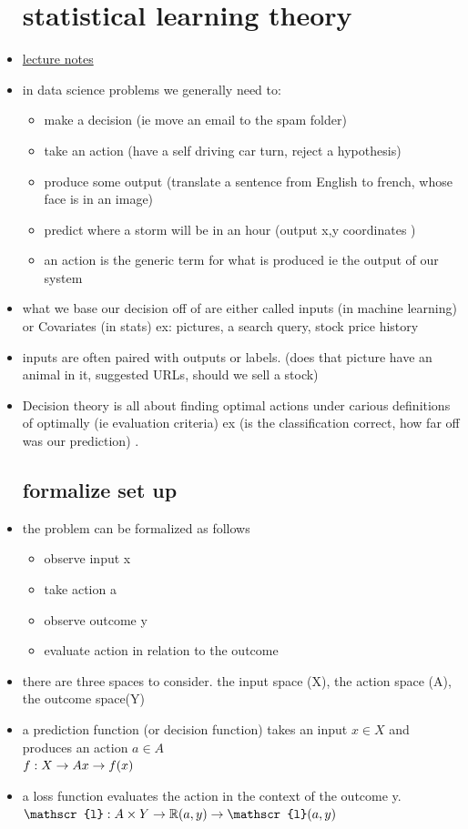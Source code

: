 \documentclass{article}
\begin{document}
\begin{itemize}
\section{statistical learning theory}
\item \href{https://nyu-ds1003.github.io/mlcourse/2023/lectures/lec01/01c.intro-stat-learning-theory.pdf}{lecture notes}
\item in data science problems we generally need to:
\begin{itemize}
    \item make a decision (ie move an email to the spam folder) 
    \item take an action (have a self driving car turn, reject a hypothesis)
    \item produce some output (translate a sentence from English to french, whose face is in an image) 
    \item predict where a storm will be in an hour (output x,y coordinates )
    \item an action is the generic term for what is produced ie the output of our system 
\end{itemize}
\item what we base our decision  off of are either called inputs (in machine learning) or Covariates  (in stats) ex: pictures, a search query, stock price history
\item inputs are often paired with outputs or labels. (does that picture have an animal in it, suggested URLs, should we sell a stock)
\item Decision  theory is all about finding optimal actions under carious definitions of optimally (ie evaluation criteria) ex (is the classification correct, how far off was our prediction) .
\subsection{formalize set up}
\item the problem can be formalized as follows
\begin{itemize}
    \item observe input x
    \item take action a
    \item observe outcome y
    \item evaluate action in relation to the outcome
\end{itemize}
\item there are three spaces to consider. the input space (X), the action space (A), the outcome space(Y)
\item a prediction function (or decision  function) takes an input $x\in X$ and produces an action $a\in A$ \\ $f:X\rightarrow A\\x\rightarrow f(x)$
\item a loss function evaluates the action in the context of the outcome y. $\\ \mathscr{l}:A\times Y\rightarrow\mathbb{R}\\(a,y)\rightarrow \mathscr{l}(a,y)$

\end{itemize}
\end{document}
